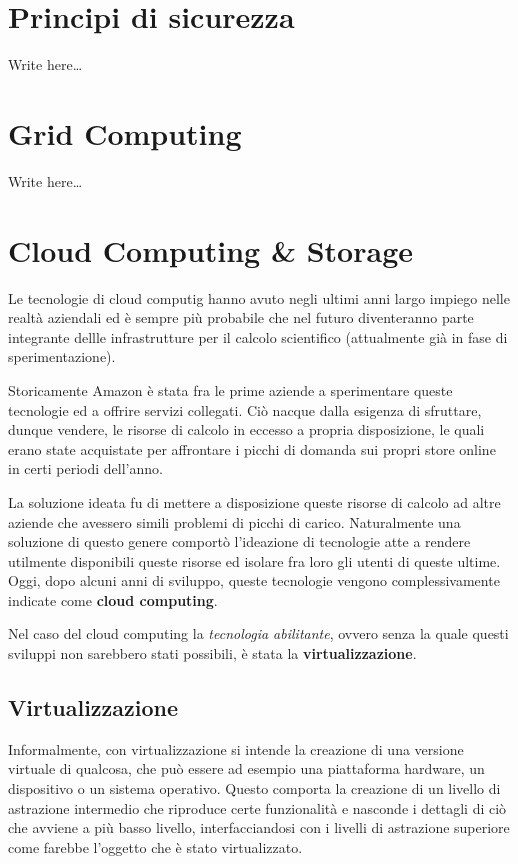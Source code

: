 \section{Principi di sicurezza}\label{principi-di-sicurezza}

Write here\ldots{}

\section{Grid Computing}\label{grid-computing}

Write here\ldots{}

\section{Cloud Computing \& Storage}\label{cloud-computing-storage}

Le tecnologie di cloud computig hanno avuto negli ultimi anni largo
impiego nelle realtà aziendali ed è sempre più probabile che nel futuro
diventeranno parte integrante dellle infrastrutture per il calcolo
scientifico (attualmente già in fase di sperimentazione).

Storicamente Amazon è stata fra le prime aziende a sperimentare queste
tecnologie ed a offrire servizi collegati. Ciò nacque dalla esigenza di
sfruttare, dunque vendere, le risorse di calcolo in eccesso a propria
disposizione, le quali erano state acquistate per affrontare i picchi di
domanda sui propri store online in certi periodi dell'anno.

La soluzione ideata fu di mettere a disposizione queste risorse di
calcolo ad altre aziende che avessero simili problemi di picchi di
carico. Naturalmente una soluzione di questo genere comportò l'ideazione
di tecnologie atte a rendere utilmente disponibili queste risorse ed
isolare fra loro gli utenti di queste ultime. Oggi, dopo alcuni anni di
sviluppo, queste tecnologie vengono complessivamente indicate come
\textbf{cloud computing}.

Nel caso del cloud computing la \emph{tecnologia abilitante}, ovvero
senza la quale questi sviluppi non sarebbero stati possibili, è stata la
\textbf{virtualizzazione}.

\subsection{Virtualizzazione}\label{virtualizzazione}

Informalmente, con virtualizzazione si intende la creazione di una
versione virtuale di qualcosa, che può essere ad esempio una piattaforma
hardware, un dispositivo o un sistema operativo. Questo comporta la
creazione di un livello di astrazione intermedio che riproduce certe
funzionalità e nasconde i dettagli di ciò che avviene a più basso
livello, interfacciandosi con i livelli di astrazione superiore come
farebbe l'oggetto che è stato virtualizzato.


